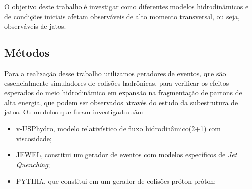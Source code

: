 O objetivo deste trabalho é investigar como diferentes modelos hidrodinâmicos e de condições iniciais afetam observáveis de alto momento transversal, ou seja, observáveis de jatos.

\subsection{Métodos}

Para a realização desse trabalho utilizamos geradores de eventos, que são essencialmente simuladores
de colisões hadrônicas, para verificar os efeitos esperados do meio hidrodinâmico em expansão na fragmentação
de partons de alta energia, que podem ser observados através do estudo da subestrutura de jatos. Os modelos que foram
investigados são:

\begin{itemize}
 \item v-USPhydro\cite{noauthor_jacquelyn_nodate,noronha-hostler_event-by-event_2016,noronha-hostler_bulk_2014,noronha-hostler_sensitivity_2016},
 modelo relativístico de fluxo hidrodinâmico(2+1) com viscosidade;
 \item JEWEL\cite{noauthor_jewel_nodate, zapp_jewel_2014}, constitui um gerador de eventos com modelos específicos de \emph{Jet Quenching};
 \item PYTHIA\cite{noauthor_pythia_nodate}, que constitui em um gerador de colisões próton-próton;
\end{itemize}